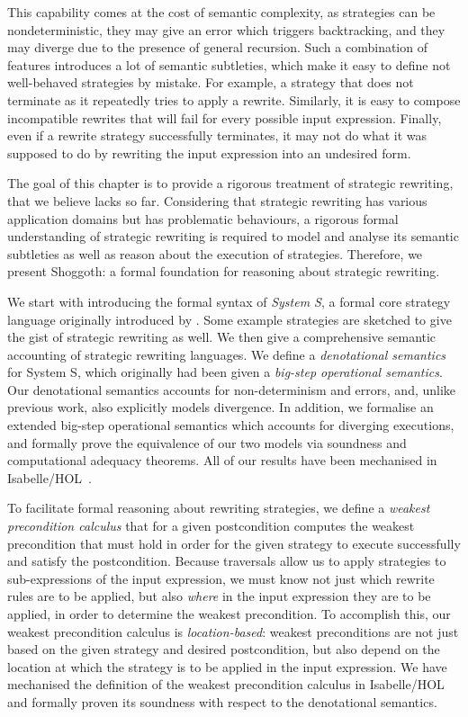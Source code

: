 This capability comes at the cost of semantic complexity, as strategies can be nondeterministic, they may give an error which triggers backtracking, and they may diverge due to the presence of general recursion. Such a combination of features introduces a lot of semantic subtleties, which make it
easy to define not well-behaved strategies by mistake. For example, a strategy that does not terminate as it repeatedly tries to apply a rewrite.
Similarly, it is easy to compose incompatible rewrites
that will fail for every possible input expression.
Finally, even if a rewrite strategy successfully terminates, it may not do what it was supposed to do by rewriting the input expression into an undesired form.

The goal of this chapter is to provide a rigorous treatment of strategic rewriting, that we believe lacks so far. Considering that strategic rewriting has various application domains but has problematic behaviours, a rigorous formal understanding of strategic rewriting is required to model and analyse its semantic subtleties as well as reason about the execution of strategies. Therefore, we present Shoggoth: a formal foundation for reasoning about strategic rewriting.

We start with introducing the formal syntax of \emph{System S}, a formal core strategy language
originally introduced by \citet{VISSER1998422}. Some example strategies are sketched to give the gist of strategic rewriting as well. We then give a comprehensive semantic
accounting of strategic rewriting languages. We define a \emph{denotational semantics} for System
S, which originally had been given
a \emph{big-step operational semantics}. Our denotational semantics accounts for non-determinism and errors, and, unlike previous work, also explicitly models divergence.
In addition, we formalise an extended big-step operational semantics which accounts for diverging executions, and formally prove the equivalence of our two models via soundness and computational adequacy theorems. All of our results have been mechanised in Isabelle/HOL~\citep{NipkowPauWen:IsabelleTut:2002}.

To facilitate formal reasoning about rewriting strategies, we define a \emph{weakest precondition calculus} that for a given postcondition computes the weakest precondition that must hold in order for the given strategy to execute successfully and satisfy the postcondition. Because traversals allow us to apply strategies to sub-expressions of the input expression, we must know not just which rewrite rules are to be applied, but also \emph{where} in the input expression they are to be applied, in order to determine the weakest precondition. To accomplish this, our weakest precondition calculus is \emph{location-based}: weakest preconditions are not just based on the given strategy and desired postcondition, but also depend on the location at which the strategy is to be applied in the input expression. We have mechanised the definition of the weakest precondition calculus in Isabelle/HOL and formally proven its soundness with respect to the denotational semantics. 

